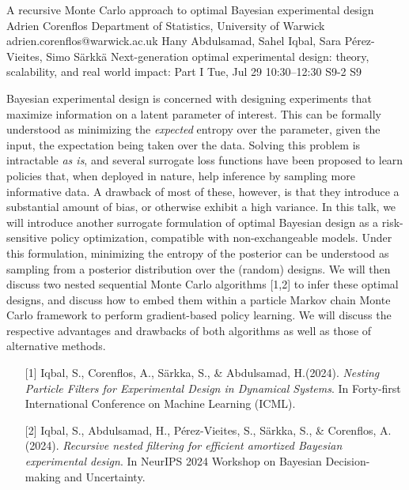 \begin{talk}
  {A recursive Monte Carlo approach to optimal Bayesian experimental design}%
  {Adrien Corenflos}%
  {Department of Statistics, University of Warwick}%
  {adrien.corenflos@warwick.ac.uk}%
  {Hany Abdulsamad, Sahel Iqbal, Sara P\'erez-Vieites, Simo Särkkä}%
  {Next-generation optimal experimental design: theory, scalability, and real world impact: Part I}%
  {Tue, Jul 29 10:30–12:30}%
  {S9-2}%
  {S9}%
				
			
    Bayesian experimental design is concerned with designing experiments that maximize information on a latent parameter of interest. 
    This can be formally understood as minimizing the \emph{expected} entropy over the parameter, given the input, the expectation being taken over the data.
    Solving this problem is intractable \emph{as is}, and several surrogate loss functions have been proposed to learn policies that, when deployed in nature, help inference by sampling more informative data.
    A drawback of most of these, however, is that they introduce a substantial amount of bias, or otherwise exhibit a high variance.
    In this talk, we will introduce another surrogate formulation of optimal Bayesian design as a risk-sensitive policy optimization, compatible with non-exchangeable models.
    Under this formulation, minimizing the entropy of the posterior can be understood as sampling from a posterior distribution over the (random) designs.
    We will then discuss two nested sequential Monte Carlo algorithms [1,2] to infer these optimal designs, and discuss how to embed them within a particle Markov chain Monte Carlo framework to perform gradient-based policy learning. 
    We will discuss the respective advantages and drawbacks of both algorithms as well as those of alternative methods.
\medskip


\begin{enumerate}
	\item[{[1]}]Iqbal, S., Corenflos, A., Särkka, S., \&  Abdulsamad, H.(2024). {\it Nesting Particle Filters for Experimental Design in Dynamical Systems}. In Forty-first International Conference on Machine Learning (ICML).
	\item[{[2]}] Iqbal, S., Abdulsamad, H., Pérez-Vieites, S., Särkka, S., \& Corenflos, A. (2024). {\it Recursive nested filtering for efficient amortized Bayesian experimental design}. In NeurIPS 2024 Workshop on Bayesian Decision-making and Uncertainty.
\end{enumerate}

\end{talk}

